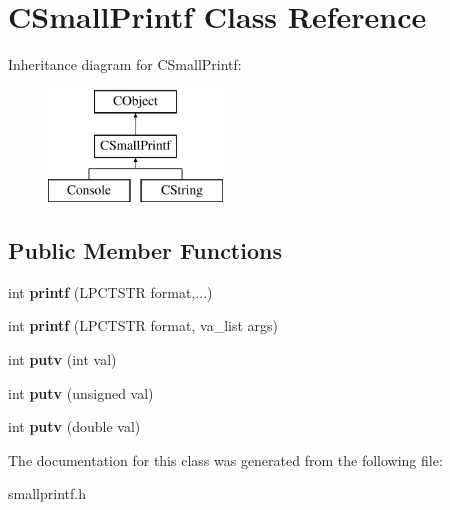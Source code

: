 \hypertarget{class_c_small_printf}{\section{C\-Small\-Printf Class Reference}
\label{class_c_small_printf}
}
Inheritance diagram for C\-Small\-Printf\-:\begin{figure}[H]
\begin{center}
\leavevmode
\includegraphics[height=3.000000cm]{class_c_small_printf}
\end{center}
\end{figure}
\subsection*{Public Member Functions}
\begin{DoxyCompactItemize}
\item 
\hypertarget{class_c_small_printf_a6213c847987bc1cf18b980619ca49db7}{int {\bfseries printf} (L\-P\-C\-T\-S\-T\-R format,...)}\label{class_c_small_printf_a6213c847987bc1cf18b980619ca49db7}

\item 
\hypertarget{class_c_small_printf_a651d3546ffbbe986fbbbf4bb1043bb7b}{int {\bfseries printf} (L\-P\-C\-T\-S\-T\-R format, va\-\_\-list args)}\label{class_c_small_printf_a651d3546ffbbe986fbbbf4bb1043bb7b}

\item 
\hypertarget{class_c_small_printf_a158dc1f45a1f19c8edd63e22544c30cc}{int {\bfseries putv} (int val)}\label{class_c_small_printf_a158dc1f45a1f19c8edd63e22544c30cc}

\item 
\hypertarget{class_c_small_printf_a4396d279d38afdf4fd71514760b6ace3}{int {\bfseries putv} (unsigned val)}\label{class_c_small_printf_a4396d279d38afdf4fd71514760b6ace3}

\item 
\hypertarget{class_c_small_printf_a9158226f537c34067bf2e6a7c25d3f8b}{int {\bfseries putv} (double val)}\label{class_c_small_printf_a9158226f537c34067bf2e6a7c25d3f8b}

\end{DoxyCompactItemize}


The documentation for this class was generated from the following file\-:\begin{DoxyCompactItemize}
\item 
smallprintf.\-h\end{DoxyCompactItemize}
